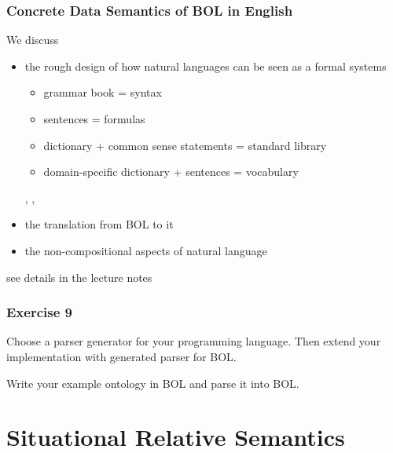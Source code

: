 \begin{frame}\frametitle{Concrete Data Semantics of BOL in English}
We discuss
\begin{itemize}
\item the rough design of how natural languages can be seen as a formal systems
  \begin{itemize}
  \item grammar book = syntax
  \item sentences = formulas
  \item dictionary + common sense statements = standard library
  \item domain-specific dictionary + sentences = vocabulary
  \end{itemize}, , 
\item the translation from BOL to it
\item the non-compositional aspects of natural language
\end{itemize}
see details in the lecture notes
\end{frame}

\begin{frame}[fragile]\frametitle{Exercise 9}
Choose a parser generator for your programming language.
Then extend your implementation with generated parser for BOL.

Write your example ontology in BOL and parse it into BOL.
\end{frame}

\section{Situational Relative Semantics}

